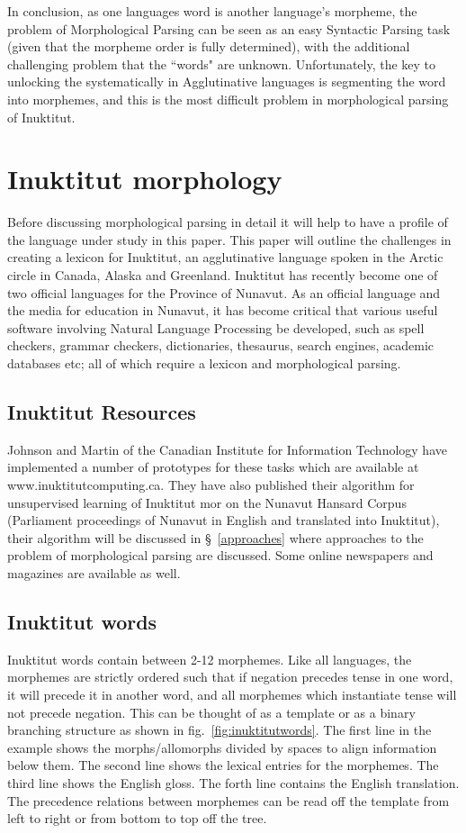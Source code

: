 \documentclass[runningheads,a4paper]{llncs}
\begin{document}
In conclusion, as one languages word is another language's morpheme, the problem of Morphological Parsing can be seen as an easy Syntactic Parsing task (given that the morpheme order is fully determined), with the additional challenging problem that the ``words" are unknown. Unfortunately, the key to unlocking the systematically in Agglutinative languages is segmenting the word into morphemes, and this is the most difficult problem in morphological parsing of Inuktitut.

\section{Inuktitut morphology}
\label{inuktitut}

Before discussing morphological parsing in detail it will help to have a profile of the language under study in this paper. This paper will outline the challenges in creating a lexicon for Inuktitut, an agglutinative language spoken in the Arctic circle in Canada, Alaska and Greenland. Inuktitut has recently become one of two official languages for the Province of Nunavut. As an official language and the media for education in Nunavut, it has become critical that various useful software involving Natural Language Processing be developed, such as spell checkers, grammar checkers, dictionaries, thesaurus, search engines, academic databases etc; all of which require a lexicon and morphological parsing. 

\subsection{Inuktitut Resources}

Johnson and Martin of the Canadian Institute for Information Technology have implemented a number of prototypes for these tasks which are available at www.inuktitutcomputing.ca. They have also published their algorithm for unsupervised learning of Inuktitut mor on the Nunavut Hansard Corpus (Parliament proceedings of Nunavut in English and translated into Inuktitut), their algorithm will be discussed in \S~\ref{approaches} where approaches to the problem of morphological parsing are discussed. Some online newspapers and magazines are available as well.

\subsection{Inuktitut words}

Inuktitut words contain between 2-12 morphemes. Like all languages, the morphemes are strictly ordered such that if negation precedes tense in one word, it will precede it in another word, and all morphemes which instantiate tense will not precede negation. This can be thought of as a template or as a binary branching structure as shown in fig.~\ref{fig:inuktitutwords}. The first line in the example shows the  morphs/allomorphs divided by spaces to align information below them. The second line shows the lexical entries for the morphemes. The third line shows the English gloss. The forth line contains the English translation. The precedence relations between morphemes can be read off the template from left to right or from bottom to top off the tree. 
\end{document}
